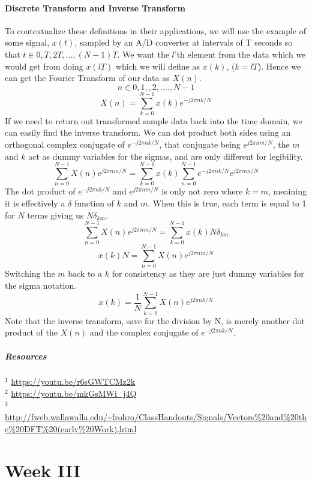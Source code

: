 \documentclass[12pt]{article}
\newcommand{\partcontent}{}
\begin{document}
\subsection{Discrete Transform and Inverse Transform}
To contextualize these definitions in their applications, we will use the example of some signal, $x(t)$, sampled by an A/D converter at intervals of T seconds so that $t \in {0, T, 2T, ..., (N-1)T}$. We want the $l$'th element from the data which we would get from doing $x(lT)$ which we will define as $x(k)$, ($k = lT$). Hence we can get the Fourier Transform of our data as $X(n)$. $$n \in {0,1,,2,...., N-1}$$ $$ X(n) =  \sum_{k=0}^{N-1} x(k)e^{-j2\pi nk/N} $$ If we need to return out transformed sample data back into the time domain, we can easily find the inverse transform. We can dot product both sides using an orthogonal complex conjugate of $e^{-j2\pi nk/N}$, that conjugate being $e^{j2\pi nm/N}$, the $m$ and $k$ act as dummy variables for the sigmas, and are only different for legibility. 
$$\sum_{n=0}^{N-1}X(n)e^{j2\pi nm/N} = \sum_{k=0}^{N-1} x(k) \sum_{n=0}^{N-1} e^{-j2\pi nk/N}e^{j2\pi nm/N}  $$ The dot product of $e^{-j2\pi nk/N}$ and $e^{j2\pi nm/N}$ is only not zero where $k=m$, meaining it is effectively a $\delta$ function of $k$ and $m$. When this is true, each term is equal to 1 for $N$ terms giving us $N \delta_{km}$. $$\sum_{n=0}^{N-1}X(n)e^{j2\pi nm/N} =  \sum_{k=0}^{N-1} x(k) N \delta_{km} $$ $$ x(k) N = \sum_{n=0}^{N-1}X(n)e^{j2\pi nm/N} $$
Switching the $m$ back to a $k$ for consistency as they are just dummy variables for the sigma notation.
$$x(k) = \frac{1}{N} \sum_{k=0}^{N-1} X(n) e^{j2\pi nk/N}$$ Note that the inverse transform, save for the division by N, is merely another dot product of the $X(n)$ and the complex conjugate of $e^{-j2\pi nk/N}$. 
 
\subsubsection*{Resources} 
$^1$ \url{https://youtu.be/r6sGWTCMz2k} \\ 
%
$^2$ \url{https://youtu.be/mkGsMWi_j4Q} \\
$^3$ \url{http://fweb.wallawalla.edu/~frohro/ClassHandouts/Signals/Vectors%20and%20the%20DFT%20(early%20Work).html} \\
%
 
 
 
\noindent\makebox[\linewidth]{\rule{\paperwidth}{0.4pt}}
\part*{Week III}
\renewcommand\partcontent{Week III}
\end{document}
